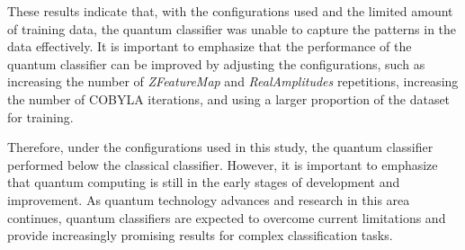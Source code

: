 These results indicate that, with the configurations used and the limited amount of training data, the quantum classifier was unable to capture the patterns in the data effectively. It is important to emphasize that the performance of the quantum classifier can be improved by adjusting the configurations, such as increasing the number of \textit{ZFeatureMap} and \textit{RealAmplitudes} repetitions, increasing the number of COBYLA iterations, and using a larger proportion of the dataset for training.

Therefore, under the configurations used in this study, the quantum classifier performed below the classical classifier. However, it is important to emphasize that quantum computing is still in the early stages of development and improvement. As quantum technology advances and research in this area continues, quantum classifiers are expected to overcome current limitations and provide increasingly promising results for complex classification tasks.